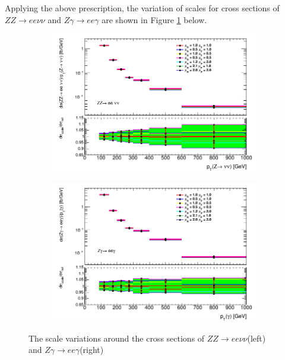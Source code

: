 \documentclass[11pt,a4paper,openright,twoside]{report}
\begin{document}
Applying the above prescription, the variation of scales for cross sections of $ZZ\to ee\nu\nu$ and $Z\gamma\to ee\gamma$ are shown in Figure \ref{fig:scale_xsec} below.
\begin{figure}[H]
\centering
	\begin{subfigure}{0.49\textwidth}
		\includegraphics[width=\linewidth]{zz_scale.png}
	\end{subfigure}
	\begin{subfigure}{0.49\textwidth}
		\includegraphics[width=\linewidth]{zg_scale.png}
	\end{subfigure}
	\caption{The scale variations around the cross sections of $ZZ\to ee\nu\nu$(left) and $Z\gamma\to ee\gamma$(right)}
	\label{fig:scale_xsec}
\end{figure}
\end{document}
